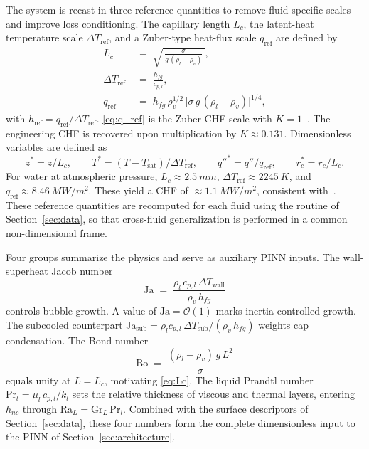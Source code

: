 The system is recast in three reference quantities to remove
fluid-specific scales and improve loss conditioning. The capillary
length $L_c$, the latent-heat temperature scale
$\Delta T_{\mathrm{ref}}$, and a Zuber-type heat-flux scale
$q_{\mathrm{ref}}$ are defined by
%
\begin{align}
L_c &\;=\; \sqrt{\,\frac{\sigma}{g\,(\rho_l - \rho_v)}\,}, \label{eq:Lc} \\
\Delta T_{\mathrm{ref}} &\;=\; \frac{h_{fg}}{c_{p,l}}, \label{eq:dT_ref} \\
q_{\mathrm{ref}} &\;=\; h_{fg}\,\rho_v^{1/2}\,\bigl[\sigma\,g\,(\rho_l - \rho_v)\bigr]^{1/4}, \label{eq:q_ref}
\end{align}
%
with $h_{\mathrm{ref}} = q_{\mathrm{ref}}/\Delta T_{\mathrm{ref}}$.
\cref{eq:q_ref} is the Zuber CHF scale with $K=1$~\citep{lienhard1981}.
The engineering CHF is recovered upon multiplication by $K \approx 0.131$.
Dimensionless variables are defined as
%
\begin{equation*}
z^{\ast} = z/L_c, \qquad
T^{\ast} = (T-T_{\mathrm{sat}})/\Delta T_{\mathrm{ref}}, \qquad
q''^{\ast} = q''/q_{\mathrm{ref}}, \qquad
r_c^{\ast} = r_c/L_c.
\end{equation*}
%
For water at atmospheric pressure, $L_c \approx \SI{2.5}{mm}$,
$\Delta T_{\mathrm{ref}} \approx \SI{2245}{K}$, and
$q_{\mathrm{ref}} \approx \SI{8.46}{MW/m^2}$. These yield a CHF of
$\approx \SI{1.1}{MW/m^2}$, consistent
with~\citet{zuber1959,lienhard1981}. These reference quantities are
recomputed for each fluid using the routine of Section~\ref{sec:data}, so
that cross-fluid generalization is performed in a common non-dimensional
frame.

Four groups summarize the physics and serve as auxiliary PINN inputs. The
wall-superheat Jacob number
%
\begin{equation}\label{eq:ja_sup}
\mathrm{Ja} \;=\;
\frac{\rho_l\,c_{p,l}\,\Delta T_{\mathrm{wall}}}{\rho_v\,h_{fg}}
\end{equation}
%
controls bubble growth. A value of $\mathrm{Ja}=\mathcal{O}(1)$ marks
inertia-controlled growth. The subcooled counterpart
$\mathrm{Ja}_{\mathrm{sub}} = \rho_l c_{p,l}\,\Delta T_{\mathrm{sub}}/(\rho_v\,h_{fg})$
weights cap condensation. The Bond number
%
\begin{equation}\label{eq:bond}
\mathrm{Bo} \;=\;
\frac{(\rho_l - \rho_v)\,g\,L^{2}}{\sigma}
\end{equation}
%
equals unity at $L=L_c$, motivating \cref{eq:Lc}. The liquid Prandtl
number $\mathrm{Pr}_l = \mu_l\,c_{p,l}/k_l$ sets the relative thickness
of viscous and thermal layers, entering $h_{nc}$ through
$\mathrm{Ra}_L = \mathrm{Gr}_L\,\mathrm{Pr}_l$. Combined with the surface
descriptors of Section~\ref{sec:data}, these four numbers form the
complete dimensionless input to the PINN of
Section~\ref{sec:architecture}.
